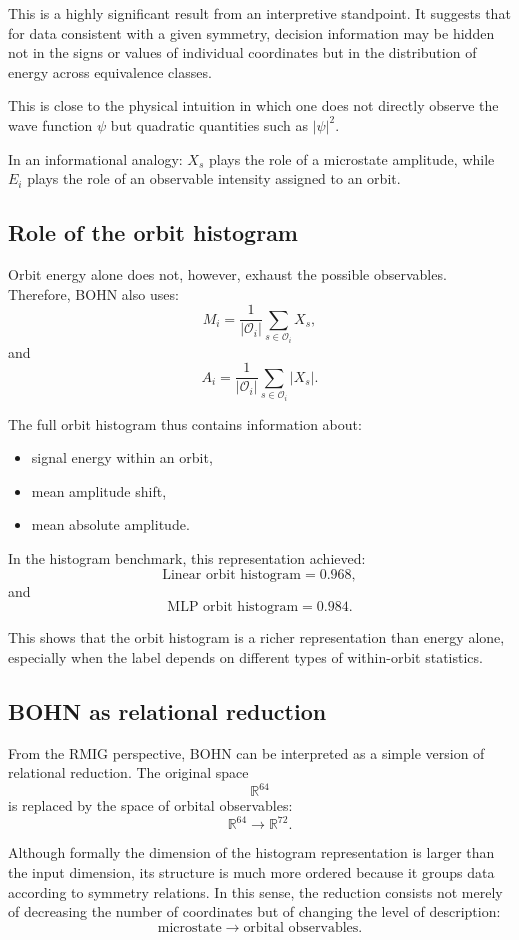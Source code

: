 \documentclass[11pt,a4paper]{report}
\begin{document}
This is a highly significant result from an interpretive standpoint. It suggests that for data consistent with a given symmetry, decision information may be hidden not in the signs or values of individual coordinates but in the distribution of energy across equivalence classes.

This is close to the physical intuition in which one does not directly observe the wave function $\psi$ but quadratic quantities such as $|\psi|^2$.

In an informational analogy: $X_s$ plays the role of a microstate amplitude, while $E_i$ plays the role of an observable intensity assigned to an orbit.

\subsection{Role of the orbit histogram}

Orbit energy alone does not, however, exhaust the possible observables. Therefore, BOHN also uses:
\[
M_i = \frac{1}{|\mathcal{O}_i|}\sum_{s\in\mathcal{O}_i} X_s,
\]
and
\[
A_i = \frac{1}{|\mathcal{O}_i|}\sum_{s\in\mathcal{O}_i} |X_s|.
\]

The full orbit histogram thus contains information about:
\begin{itemize}
\item signal energy within an orbit,
\item mean amplitude shift,
\item mean absolute amplitude.
\end{itemize}

In the histogram benchmark, this representation achieved:
\[
\text{Linear orbit histogram} = 0.968,
\]
and
\[
\text{MLP orbit histogram} = 0.984.
\]

This shows that the orbit histogram is a richer representation than energy alone, especially when the label depends on different types of within-orbit statistics.

\subsection{BOHN as relational reduction}

From the RMIG perspective, BOHN can be interpreted as a simple version of relational reduction. The original space
\[
\mathbb{R}^{64}
\]
is replaced by the space of orbital observables:
\[
\mathbb{R}^{64} \longrightarrow \mathbb{R}^{72}.
\]

Although formally the dimension of the histogram representation is larger than the input dimension, its structure is much more ordered because it groups data according to symmetry relations. In this sense, the reduction consists not merely of decreasing the number of coordinates but of changing the level of description:
\[
\text{microstate} \longrightarrow \text{orbital observables}.
\]
\end{document}
